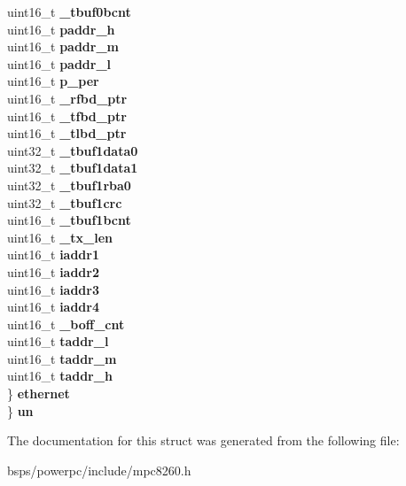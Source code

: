 \begin{DoxyCompactItemize}
\begin{tabbing}
\>\>uint16\_t {\bfseries \_tbuf0bcnt}\\
\>\>uint16\_t {\bfseries paddr\_h}\\
\>\>uint16\_t {\bfseries paddr\_m}\\
\>\>uint16\_t {\bfseries paddr\_l}\\
\>\>uint16\_t {\bfseries p\_per}\\
\>\>uint16\_t {\bfseries \_rfbd\_ptr}\\
\>\>uint16\_t {\bfseries \_tfbd\_ptr}\\
\>\>uint16\_t {\bfseries \_tlbd\_ptr}\\
\>\>uint32\_t {\bfseries \_tbuf1data0}\\
\>\>uint32\_t {\bfseries \_tbuf1data1}\\
\>\>uint32\_t {\bfseries \_tbuf1rba0}\\
\>\>uint32\_t {\bfseries \_tbuf1crc}\\
\>\>uint16\_t {\bfseries \_tbuf1bcnt}\\
\>\>uint16\_t {\bfseries \_tx\_len}\\
\>\>uint16\_t {\bfseries iaddr1}\\
\>\>uint16\_t {\bfseries iaddr2}\\
\>\>uint16\_t {\bfseries iaddr3}\\
\>\>uint16\_t {\bfseries iaddr4}\\
\>\>uint16\_t {\bfseries \_boff\_cnt}\\
\>\>uint16\_t {\bfseries taddr\_l}\\
\>\>uint16\_t {\bfseries taddr\_m}\\
\>\>uint16\_t {\bfseries taddr\_h}\\
\>\} {\bfseries ethernet}\\
\} {\bfseries un}\\

\end{tabbing}\end{DoxyCompactItemize}


The documentation for this struct was generated from the following file\+:\begin{DoxyCompactItemize}
\item 
bsps/powerpc/include/mpc8260.\+h\end{DoxyCompactItemize}
